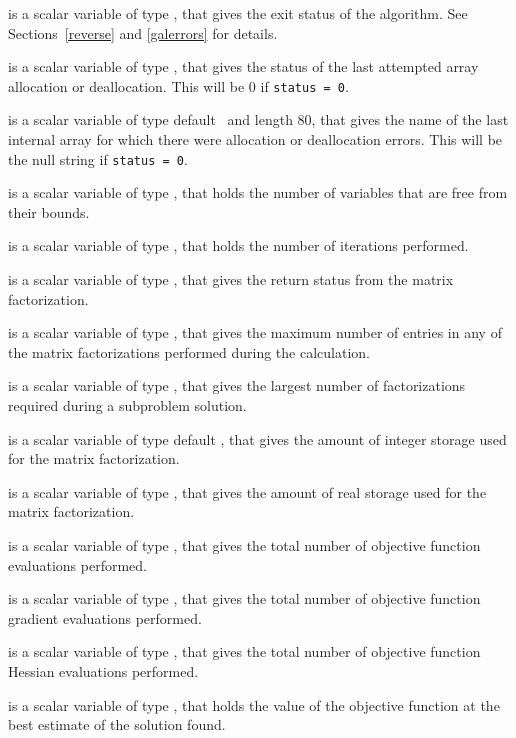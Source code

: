 \documentclass{galahad}
\begin{document}
\begin{description}
 is a scalar variable of type \integer, that gives the
exit status of the algorithm.
See Sections~\ref{reverse} and \ref{galerrors}
for details.

 is a scalar variable of type \integer, that gives
the status of the last attempted array allocation or deallocation.
This will be 0 if {\tt status = 0}.

 is a scalar variable of type default \character\
and length 80, that  gives the name of the last internal array
for which there were allocation or deallocation errors.
This will be the null string if {\tt status = 0}.

 is a scalar variable of type \integer, that holds the
number of variables that are free from their bounds.

 is a scalar variable of type \integer, that holds the
number of iterations performed.

 is a scalar variable of type \integer, that
gives the return status from the matrix factorization.

 is a scalar variable of type \longinteger, that
gives the maximum number of entries in any of the matrix factorizations
performed during the calculation.

 is a scalar variable of type \integer, that
gives the largest number of factorizations required during a subproblem
solution.

 is a scalar variable of type default
\integer, that gives the amount of integer storage used for the matrix
factorization.

 is a scalar variable of type \integer,
that gives the amount of real storage used for the matrix factorization.

 is a scalar variable of type \integer, that gives the
total number of objective function evaluations performed.

 is a scalar variable of type \integer, that gives the
total number of objective function gradient evaluations performed.

 is a scalar variable of type \integer, that gives the
total number of objective function Hessian evaluations performed.

 is a scalar variable of type \realdp, that holds the
value of the objective function at the best estimate of the solution found.


\end{description}
\end{document}
